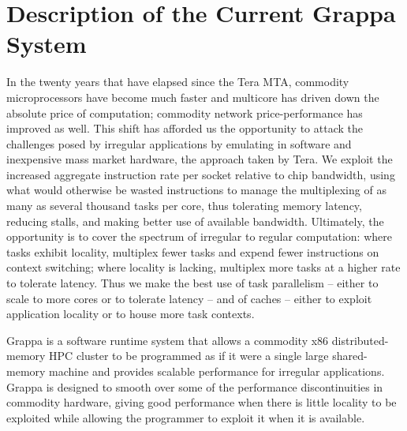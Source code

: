 \section{Description of the Current Grappa System}

In the twenty years that have elapsed since the Tera MTA, commodity
microprocessors have become much faster and multicore has driven down the
absolute price of computation; commodity network price-performance has
improved as well. This shift has afforded us the opportunity to attack the
challenges posed by irregular applications by emulating in software and
inexpensive mass market hardware, the approach taken by Tera. We exploit the
increased aggregate instruction rate per socket relative to chip bandwidth,
using what would otherwise be wasted instructions to manage the multiplexing
of as many as several thousand tasks per core, thus tolerating memory latency,
reducing stalls, and making better use of available bandwidth. Ultimately, the
opportunity is to cover the spectrum of irregular to regular computation:
where tasks exhibit locality, multiplex fewer tasks and expend fewer
instructions on context switching; where locality is lacking, multiplex more
tasks at a higher rate to tolerate latency. Thus we make the best use of task
parallelism -- either to scale to more cores or to tolerate latency -- and of
caches -- either to exploit application locality or to house more task
contexts.

Grappa is a software runtime system that allows
a commodity x86 distributed-memory HPC cluster to be programmed as if it
were a single large shared-memory machine and provides scalable
performance for irregular applications. Grappa is designed to smooth
over some of the performance discontinuities in commodity hardware,
giving good performance when there is little locality to be exploited
while allowing the programmer to exploit it when it is available. 

